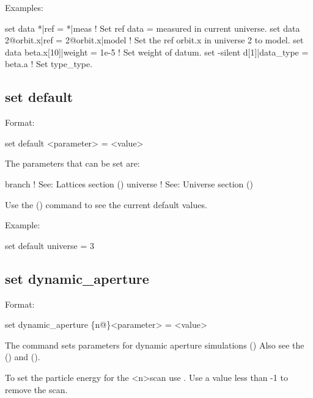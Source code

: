 {{Examples:
\begin{example}
  set data *|ref = *|meas              ! Set ref data = measured in current universe.
  set data 2@orbit.x|ref = 2@orbit.x|model 
                                       ! Set the ref orbit.x in universe 2 to model.
  set data beta.x[10]|weight = 1e-5    ! Set weight of datum.
  set -silent d[1]|data_type = beta.a  ! Set type_type.
\end{example}


\subsection{set default}
\label{s:set.default}

Format:
\begin{example}
  set default <parameter> = <value>
\end{example}

The parameters that can be set are:
\begin{example}
  branch            ! See: Lattices section ()
  universe          ! See: Universe section ()
\end{example}

Use the  () command to see the current
default values.

Example:
\begin{example}
  set default universe = 3
\end{example}


\subsection{set dynamic_aperture}
\label{s:set.da}

Format:
\begin{example}
  set dynamic_aperture \{n@\}<parameter> = <value>
\end{example}

The  command sets parameters for dynamic aperture simulations
() Also see the  () and
 ().

To set the particle energy for the <n>\Th scan use . Use a value less than -1 to remove
the scan.

}}
